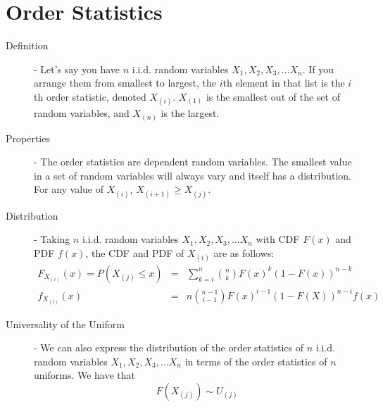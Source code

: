 \documentclass[11pt]{article}
\begin{document}
\section*{Order Statistics}
\begin{description}
  \item[Definition] - Let's say you have $n$ i.i.d. random variables $X_1, X_2, X_3, \dots X_n$. If you arrange them from smallest to largest, the $i$th element in that list is the $i$th order statistic, denoted $X_{(i)}$. $X_{(1)}$ is the smallest out of the set of random variables, and $X_{(n)}$ is the largest.
  \item[Properties] - The order statistics are dependent random variables. The smallest value in a set of random variables will always vary and itself has a distribution. For any value of $X_{(i)}$, $X_{(i+1)} \geq X_{(j)}$.
  \item[Distribution] - Taking $n$ i.i.d. random variables $X_1, X_2, X_3, \dots X_n$ with CDF $F(x)$ and PDF $f(x)$, the CDF and PDF of $X_{(i)}$ are as follows:
  \begin{align*}
    F_{X_{(i)}}(x) = P (X_{(j)} \leq x) &=& \sum_{k=i}^n {n \choose k} F(x)^k(1 - F(x))^{n - k} \\
    f_{X_{(i)}}(x) &=& n{n - 1 \choose i - 1}F(x)^{i-1}(1 - F(X))^{n-i}f(x)
  \end{align*}
  \item[Universality of the Uniform] - We can also express the distribution of the order statistics of $n$  i.i.d. random variables $X_1, X_2, X_3, \dots X_n$ in terms of the order statistics of $n$ uniforms. We have that
  \[F(X_{(j)}) \sim U_{(j)}\]
\end{description}
\end{document}
